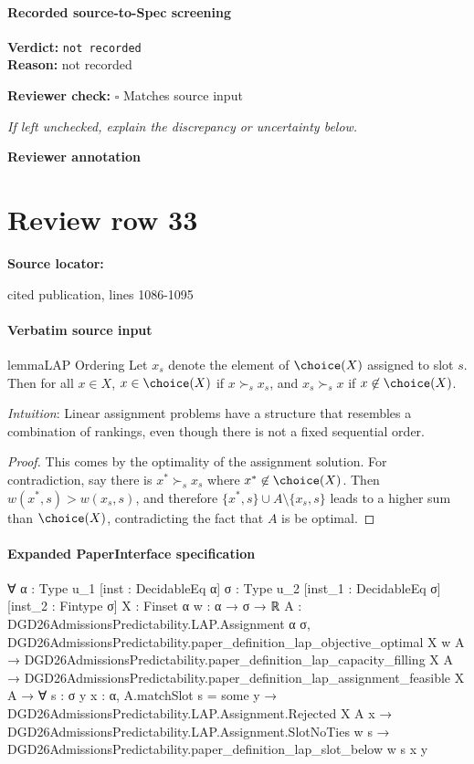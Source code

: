 \documentclass[10pt]{article}
\newcommand{\reviewerbox}{%
  \par\noindent\fbox{\parbox{0.96\linewidth}{\rule{0pt}{0.38in}}}\par
}
\newcommand{\reviewmatch}[1]{%
  \par\noindent\textbf{Reviewer check:} $\square$\; #1\par
  \noindent\emph{If left unchecked, explain the discrepancy or uncertainty below.}\par
}
\begin{document}
\paragraph{Recorded source-to-Spec screening}
\textbf{Verdict:} \texttt{not recorded}
\\
\textbf{Reason:} not recorded
\reviewmatch{Matches source input}
\noindent\textbf{Reviewer annotation}\par
\reviewerbox
\clearpage
\hypertarget{source-claim-5e3bd8769e715d3c}{}
\section*{Review row 33}
\textbf{Source locator:} {\footnotesize\raggedright cited publication, lines 1086-\allowbreak{}1095\par}
\paragraph{Verbatim source input}
\begin{ReviewVerbatim}
\begin{restatable}{lemma}{LAP Ordering}
\label{lem:lap-ordering}
Let $x_{s}$ denote the element of $\choice(X)$ assigned to slot $s$. Then for all $x \in X$, $x \in \choice(X)$ if $x \succ_s x_s$, and $x_s \succ_s x$ if $x \not\in \choice(X)$.
\end{restatable}

\textit{Intuition}: Linear assignment problems have a structure that resembles a combination of rankings, even though there is not a fixed sequential order.

\begin{proof}
This comes by the optimality of the assignment solution. For contradiction, say there is $x^* \succ_s x_s$ where $x^* \not\in \choice(X)$. Then $w(x^*, s) > w(x_s, s)$, and therefore $\{x^*, s\} \cup A \setminus \{x_s, s\}$ leads to a higher sum than $\choice(X)$, contradicting the fact that $A$ is be optimal.
\end{proof}
\end{ReviewVerbatim}


\paragraph{Expanded PaperInterface specification}
\begin{ReviewVerbatim}
∀ {α : Type u_1} [inst : DecidableEq α] {σ : Type u_2} [inst_1 : DecidableEq σ] [inst_2 : Fintype σ] {X : Finset α}
  {w : α → σ → ℝ} {A : DGD26AdmissionsPredictability.LAP.Assignment α σ},
  DGD26AdmissionsPredictability.paper_definition_lap_objective_optimal X w A →
    DGD26AdmissionsPredictability.paper_definition_lap_capacity_filling X A →
      DGD26AdmissionsPredictability.paper_definition_lap_assignment_feasible X A →
        ∀ {s : σ} {y x : α},
          A.matchSlot s = some y →
            DGD26AdmissionsPredictability.LAP.Assignment.Rejected X A x →
              DGD26AdmissionsPredictability.LAP.Assignment.SlotNoTies w s →
                DGD26AdmissionsPredictability.paper_definition_lap_slot_below w s x y
\end{ReviewVerbatim}
\end{document}
